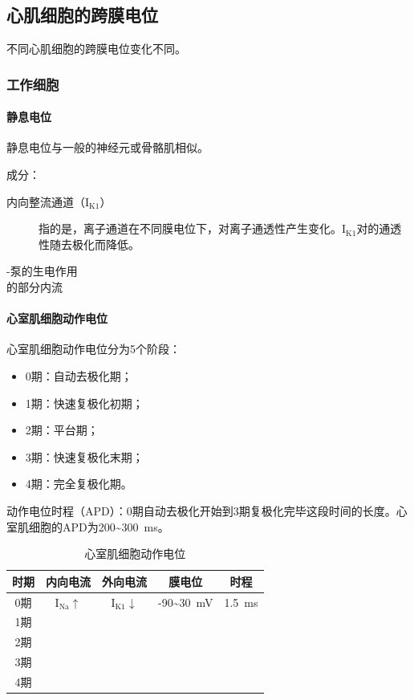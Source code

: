 \subsection{心肌细胞的跨膜电位}

不同心肌细胞的跨膜电位变化不同。

\subsubsection{工作细胞}

\paragraph{静息电位}

静息电位与一般的神经元或骨骼肌相似。

成分：

\begin{description}
	\item[内向整流通道（I$_{\text{K1}}$）] 指的是，离子通道在不同膜电位下，对离子通透性产生变化。I$_{\text{K1}}$对的通透性随去极化而降低。
	\item[-泵的生电作用]
	\item[的部分内流]
\end{description}

\paragraph{心室肌细胞动作电位}

心室肌细胞动作电位分为5个阶段：

\begin{itemize}
	\item 0期：自动去极化期；
	\item 1期：快速复极化初期；
	\item 2期：平台期；
	\item 3期：快速复极化末期；
	\item 4期：完全复极化期。
\end{itemize}

动作电位时程（APD）：0期自动去极化开始到3期复极化完毕这段时间的长度。心室肌细胞的APD为200\textasciitilde\SI{300}{\ms}。

\begin{table}[htbp]
	\centering
	\begin{tabularx}{\textwidth}{|c|C|C|c|c|}
		\hline
		时期 & 内向电流 & 外向电流 & 膜电位 & 时程 \\ \hline
		0期 & I$_{\text{Na}}$$\uparrow$ & I$_{\text{K1}}$$\downarrow$ & -90\textasciitilde\SI{+30}{\mV} & \SI{1.5}{\ms} \\ \hline
		1期 &  &  &  &  \\ \hline
		2期 &  &  &  &  \\ \hline
		3期 &  &  &  &  \\ \hline
		4期 &  &  &  &  \\ \hline
	\end{tabularx}
	\caption{心室肌细胞动作电位}
	\label{tab:心室肌细胞动作电位}
\end{table}


